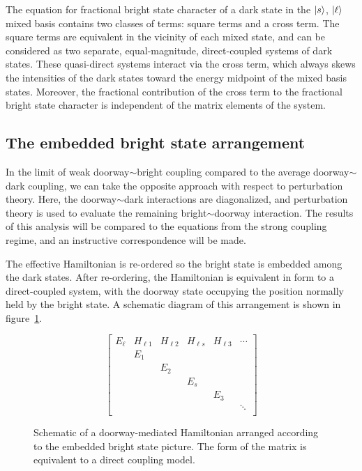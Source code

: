 \documentclass[12pt]{mitthesis}
\begin{document}
The equation for fractional bright state character of a dark state in
the $\mathinner{|{s}\rangle}$, $\mathinner{|{\ell}\rangle}$ mixed basis contains two classes of terms:
square terms and a cross term. The square terms are equivalent in the
vicinity of each mixed state, and can be considered as two separate,
equal-magnitude, direct-coupled systems of dark states. These
quasi-direct systems interact via the cross term, which always skews
the intensities of the dark states toward the energy midpoint of the
mixed basis states. Moreover, the fractional contribution of the cross
term to the fractional bright state character is independent of the
matrix elements of the system.

\subsection{The embedded bright state arrangement}
\label{sec:ebsa}

In the limit of weak doorway$\sim$bright coupling compared to the average
doorway$\sim$dark coupling, we can take the opposite approach with respect
to perturbation theory. Here, the doorway$\sim$dark interactions are
diagonalized, and perturbation theory is used to evaluate the
remaining bright$\sim$doorway interaction. The results of this analysis
will be compared to the equations from the strong coupling regime, and
an instructive correspondence will be made.

The effective Hamiltonian is re-ordered so the bright state is
embedded among the dark states.  After re-ordering, the Hamiltonian is
equivalent in form to a direct-coupled system, with the doorway state
occupying the position normally held by the bright state.  A schematic
diagram of this arrangement is shown in figure~\ref{fig:matrix-ebsa}.

\begin{figure}
  \caption{Schematic of a doorway-mediated Hamiltonian arranged
    according to the embedded bright state picture. The form of the
    matrix is equivalent to a direct coupling model.}
  \label{fig:matrix-ebsa}
  \begin{equation*}
    \begin{bmatrix}
      E_\ell & H_{\ell 1} & H_{\ell 2} & H_{\ell s} & H_{\ell 3} & \dotsm \\
      & E_1 \\
      & & E_2 \\
      & & & E_s \\
      & & & & E_3 \\
      & & & & & \ddots \\
    \end{bmatrix}
  \end{equation*}
\end{figure}
\end{document}

